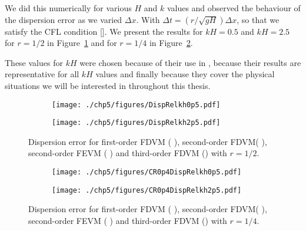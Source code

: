 We did this numerically for various $H$ and $k$ values and observed the behaviour of the dispersion error as we varied $\Delta x$. With $\Delta t =   \left( r / \sqrt{gH} \right) {\Delta x} $, so that we satisfy the CFL condition []. We present the results for $kH = 0.5$ and $kH = 2.5$ for $r=1/2$ in Figure~\ref{fig:DispErrMeth1} and for $r=1/4$ in Figure~\ref{fig:DispErrMeth2}.

These values for $kH$ were chosen because of their use in \cite{Filippini-etal-2016-381}, because their results are representative for all $kH$ values and finally because they cover the physical situations we will be interested in throughout this thesis.
\begin{figure}
	\centering
	\begin{subfigure}{0.5\textwidth}
		\texttt{[image: ./chp5/figures/DispRelkh0p5.pdf]}
	\end{subfigure}%
	\begin{subfigure}{0.5\textwidth}
		\texttt{[image: ./chp5/figures/DispRelkh2p5.pdf]}
	\end{subfigure}
	\caption{Dispersion error for first-order FDVM ({\color{green!60!black} \solidrule}), second-order FDVM({\color{red} \solidrule}), second-order FEVM ({\color{blue} \solidrule})  and third-order FDVM ({\solidrule}) with $r = 1/2$.}
	\label{fig:DispErrMeth1}
\end{figure}

\begin{figure}
	\centering
	\begin{subfigure}{0.5\textwidth}
		\texttt{[image: ./chp5/figures/CR0p4DispRelkh0p5.pdf]}
	\end{subfigure}%
	\begin{subfigure}{0.5\textwidth}
		\texttt{[image: ./chp5/figures/CR0p4DispRelkh2p5.pdf]}
	\end{subfigure}
	\caption{Dispersion error for first-order FDVM ({\color{green!60!black} \solidrule}), second-order FDVM({\color{red} \solidrule}), second-order FEVM ({\color{blue} \solidrule})  and third-order FDVM ({\solidrule}) with $r = 1/4$.}
	\label{fig:DispErrMeth2}
\end{figure}

